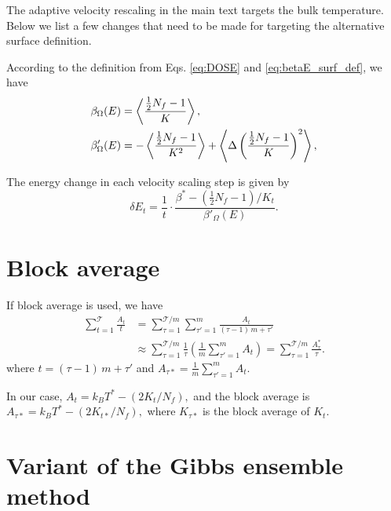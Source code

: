 \documentclass[reprint]{revtex4-1}
\begin{document}
The adaptive velocity rescaling in the main text
targets the bulk temperature.
%
Below we list a few changes that need to be made
for targeting the alternative surface definition.

According to the definition from
Eqs. \eqref{eq:DOSE} and \eqref{eq:betaE_surf_def},
we have
\begin{align}
  \beta_\Omega(E)
  &=
  \left\langle
    \frac{ \frac{1}{2}N_f - 1 } { K }
  \right\rangle
  ,
  \notag
  \\
  \beta'_\Omega(E)
  &=
  -
  \left\langle
    \frac{ \frac{1}{2} N_f - 1 } { K^2 }
  \right\rangle
  +
  \left\langle
    \Delta
    \left(
      \frac{ \frac{1}{2} N_f - 1 } { K }
    \right)^2
  \right\rangle
  ,
  \notag
\end{align}

The energy change in each velocity scaling step is given by
\begin{equation}
  \delta E_t
  =
  \frac{1}{t} \cdot
  \frac{ \beta^* - (\frac{1}{2} N_f - 1)/K_t }
  { \beta'_\Omega(E) }
  .
\end{equation}




\section{\label{sec:block}
Block average}

\newcommand{\tmax}{\mathcal T}

If block average is used, we have
%
\begin{align*}
  \sum_{t = 1}^{\tmax} \frac{ A_t } { t }
  &=
  \sum_{\tau = 1}^{\tmax/m}
  \sum_{\tau' = 1}^{m}
  \frac{ A_t } { (\tau - 1) \, m + \tau' }
  \\
  &\approx
  \sum_{\tau = 1}^{\tmax/m}
  \frac{ 1 } { \tau }
  \left(
    \frac 1 m
    \sum_{\tau' = 1}^m
    A_t
  \right)
  =
  \sum_{\tau = 1}^{\tmax/m}
  \frac{ A^*_\tau } { \tau }
  .
\end{align*}
%
where
$t = (\tau - 1) \, m + \tau'$
and
$
A_{\tau*} = \frac 1 m
\sum_{\tau' = 1}^m A_t.
$

In our case,
$
A_t = k_B T^* - \left( 2 K_t / N_f\right),
$
and the block average is
$
A_{\tau*}
= k_B T^* - \left( 2 K_{t*} / N_f\right),
$
where $K_{\tau*}$
is the block average of $K_t$.


\section{\label{sec:gibbs}
Variant of the Gibbs ensemble method
}
\end{document}
